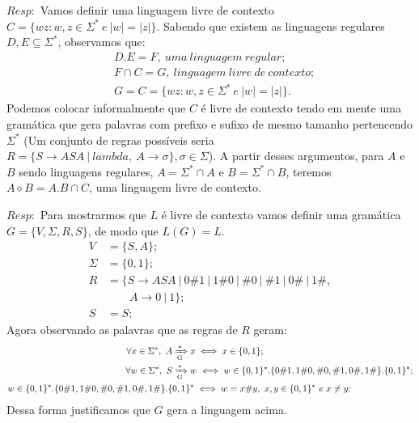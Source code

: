 \documentclass{homework}
\begin{document}
\pagebreak

	$Resp:$ Vamos definir uma linguagem livre de contexto $C = \{wz: w,z \in \Sigma^*\ e\ |w|=|z|\}$. Sabendo que existem as linguagens regulares $D,E \subseteq \Sigma^*$, observamos que:
	\begin{align}
		& D.E = F,\ uma\ linguagem\ regular;\\
		& F \cap C = G,\ linguagem\ livre\ de\ contexto;\\
		& G = C =\{wz: w,z \in \Sigma^*\ e\ |w|=|z|\}.
	\end{align}
	Podemos colocar informalmente que $C$ é livre de contexto tendo em mente uma gramática que gera palavras com prefixo e sufixo de mesmo tamanho pertencendo $\Sigma^*$ (Um conjunto de regras possíveis seria $R = \{S \rightarrow ASA\ |\ lambda,\ A \rightarrow \sigma\}, \sigma \in \Sigma$). A partir desses argumentos, para $A$ e $B$  sendo linguagens regulares, $A = \Sigma^* \cap A$ e $B = \Sigma^* \cap B$, teremos $A \diamond B = A.B \cap C$, uma linguagem livre de contexto.
	
	$Resp:$ Para mostrarmos que $L$ é livre de contexto vamos definir uma gramática $G = \{V, \Sigma, R, S\}$, de modo que $L(G) = L$.
	\begin{align*}
		V & = \{S,A\};\\
		\Sigma & = \{0,1\};\\
		R & = \{S \rightarrow ASA\ |\ 0\#1\ |\ 1\#0\ |\ \#0\ |\ \#1\ |\ 0\#\ |\ 1\#,\\
			& \qquad A \rightarrow 0\ |\ 1\};\\
		S & = S;
	\end{align*}
	Agora observando as palavras que as regras de $R$ geram:
		\begin{align*}
			\forall x \in \Sigma^*,\ A & \xRightarrow[\text{G}]{*} x \iff x \in \{0,1\};\\
			\forall w \in \Sigma^*,\ S & \xRightarrow[\text{G}]{*} w \iff w \in \{0,1\}^*.\{0\#1,1\#0,\#0,\#1,0\#,1\#\}.\{0,1\}^*;\\
			w \in \{0,1\}^*.\{0\#1,1\#0,\#0,\#1,0\#,1\#\}.\{&0,1\}^* \iff w = x\#y,\ x,y \in \{0,1\}^*\ e\ x \neq y;
		\end{align*}
		Dessa forma justificamos que $G$ gera a linguagem acima.
		
\end{document}
